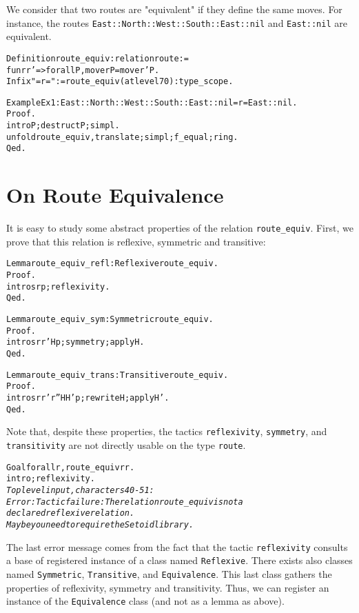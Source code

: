 \documentclass[a4]{report}
\begin{document}
We consider that two routes are "equivalent" if they define
the same moves. For instance, the routes
\texttt{East::North::West::South::East::nil} and \texttt{East::nil}
are equivalent.

\begin{alltt}
Definition route_equiv : relation route :=
  fun r r' => forall P, move r P = move r' P.
Infix "=r=" := route_equiv (at level 70):type_scope.

Example Ex1 : East::North::West::South::East::nil =r=  East::nil.
Proof.
  intro P;destruct P;simpl.
  unfold route_equiv,translate;simpl;f_equal;ring.
Qed.
\end{alltt}

\section{On Route Equivalence}

It is easy to study some abstract properties of the relation \texttt{route\_equiv}. First, we prove that this relation is reflexive, symmetric and transitive:

\begin{alltt}
Lemma route_equiv_refl : Reflexive route_equiv.
Proof.
 intros r p;reflexivity.
Qed.

Lemma route_equiv_sym : Symmetric route_equiv.
Proof.
 intros r r' H p; symmetry;apply H.
Qed.

Lemma route_equiv_trans : Transitive route_equiv.
Proof.
 intros r r' r'' H H' p; rewrite H; apply H'.
Qed.
\end{alltt}

Note that, despite these properties, the tactics \texttt{reflexivity},
\texttt{symmetry}, and \texttt{transitivity} are not directly usable
on the type \texttt{route}.

\begin{alltt}
Goal forall r, route_equiv r r.
intro; reflexivity.\it\color{red}
Toplevel input, characters 40-51:
Error: Tactic failure: The relation route_equiv is not a 
  declared reflexive relation.
   Maybe you need to require the Setoid library.
\end{alltt}

The last error message comes from the fact that the tactic 
\texttt{reflexivity} consults a base of registered instance of a class
named \texttt{Reflexive}. There exists also classes named \texttt{Symmetric},
\texttt{Transitive}, and \texttt{Equivalence}.
This last class gathers the properties of reflexivity, symmetry and transitivity.
Thus, we can register an instance of the \texttt{Equivalence} class (and
not as a lemma as above).
\end{document}
